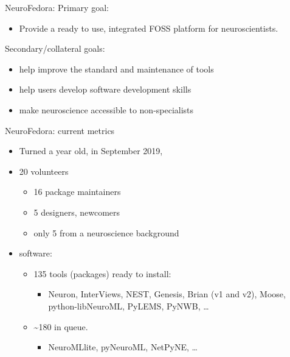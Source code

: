 \begin{frame}[c]{NeuroFedora:}
	\textcolor{FedoraBlue}{Primary goal:}
	\begin{itemize}
		\item Provide a \alert{ready to use, integrated FOSS platform} for neuroscientists\footnotemark[7].
	\end{itemize}
	\textcolor{FirstGreen}{Secondary/collateral goals:}
	\begin{itemize}
		\item help \alert{improve the standard and maintenance} of tools
		\item help users \alert{develop software development skills}
		\item \alert{make neuroscience accessible} to non-specialists
	\end{itemize}
\end{frame}

\begin{frame}[c]{NeuroFedora: current metrics}
	\begin{itemize}
		\item \alert{Turned a year old, in September 2019\footnotemark[8],}
		\item \textcolor{FirstGreen}{20 volunteers}
		\begin{itemize}
			\item 16 package maintainers
			\item 5 designers, newcomers
			\item only 5 from a neuroscience background
		\end{itemize}
		\item \textcolor{FriendsMagenta}{software:}
		\begin{itemize}
			\item 135 tools (packages) ready to install\footnotemark[9]:
			\begin{itemize}
				\item Neuron, InterViews, NEST, Genesis, Brian (v1 and v2), Moose, python-libNeuroML, PyLEMS, PyNWB, \ldots
			\end{itemize}
			\item \textasciitilde{}180 in queue\footnotemark[10].
			\begin{itemize}
				\item NeuroMLlite, pyNeuroML, NetPyNE, \ldots
			\end{itemize}
		\end{itemize}
	\end{itemize}
\end{frame}

